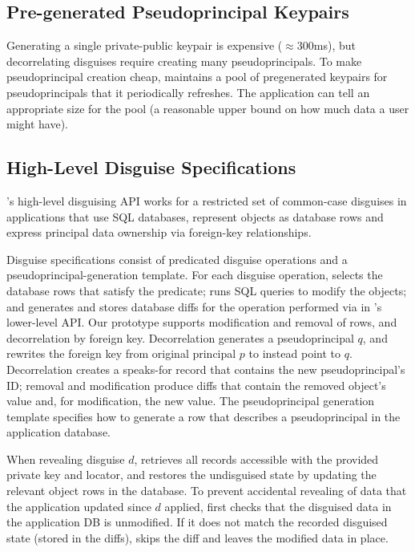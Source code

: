 \subsection{Pre-generated Pseudoprincipal Keypairs}
%
Generating a single private-public keypair is expensive ($\approx$300ms), but
decorrelating disguises require creating many pseudoprincipals.
%
To make pseudoprincipal creation cheap, \sys maintains a pool of
pregenerated keypairs for pseudoprincipals that it periodically refreshes.
%
The application can tell \sys an appropriate size for the pool (\eg a reasonable
upper bound on how much data a user might have).
%
%

\subsection{High-Level Disguise Specifications}
%
\sys's high-level disguising API works for a restricted set of common-case
disguises in applications that use SQL databases, represent objects as
database rows and express principal data ownership via foreign-key
relationships.
%

%
Disguise specifications consist of predicated disguise operations
and a pseudoprincipal-generation template.
%
For each disguise operation, \sys selects the database rows that satisfy
the predicate; runs SQL queries to modify the objects; and generates and
stores database diffs for the operation performed via  in
\sys's lower-level API.
%
Our prototype supports modification and removal of rows, and decorrelation
by foreign key.
%
Decorrelation generates a pseudoprincipal $q$, and rewrites the foreign
key from original principal $p$ to instead point to $q$.
%
Decorrelation creates a speaks-for record that contains the new
pseudoprincipal's ID; removal and modification produce diffs that contain
the removed object's value and, for modification, the new value.
%
The pseudoprincipal generation template specifies how to generate a row
that describes a pseudoprincipal in the application database.
%

When revealing disguise $d$, \sys retrieves all records accessible with
the provided private key and locator, and restores the undisguised state
by updating the relevant object rows in the database.
%
To prevent accidental revealing of data that the application updated
since $d$ applied, \sys first checks that the disguised data in the
application DB is unmodified.
%
If it does not match the recorded disguised state (stored in the diffs),
\sys skips the diff and leaves the modified data in place.
%

